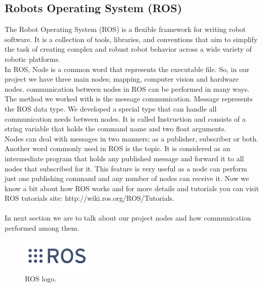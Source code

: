 \documentclass[12pt]{article}
\begin{document}
\subsection{Robots Operating System (ROS)}
The Robot Operating System (ROS) is a flexible framework for writing robot software. It is a collection of tools, libraries, and conventions that aim to simplify the task of creating complex and robust robot behavior across a wide variety of robotic platforms. \cite{201} \\
In ROS, Node is a common word that represents the executable file. So, in our project we have three main nodes; mapping, computer vision and hardware nodes. communication between nodes in ROS can be performed in many ways. The method we worked with is the message communication. Message represents the ROS data type. We developed a special type that can handle all communication needs between nodes. It is called Instruction and consists of a string variable that holds the command name and two float arguments. \\
Nodes can deal with messages in two manners; as a publisher, subscriber or both. Another word commonly used in ROS is the topic. It is considered as an intermediate program that holds any published message and forward it to all nodes that subscribed for it. This feature is very useful as a node can perform just one publishing command and any number of nodes can receive it. 
Now we know a bit about how ROS works and for more details and tutorials you can visit ROS tutorials site: http://wiki.ros.org/ROS/Tutorials. \\ \\
In next section we are to talk about our project nodes and how communication performed among them.
\begin{figure}[H]
	\centering
	\includegraphics[width = 0.3\textwidth]{Fig/rosLogo.png}
	\caption{ROS logo.}
\end{figure}

\newpage
\end{document}
